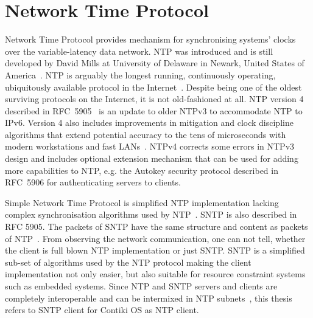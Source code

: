 
\chapter{Network Time Protocol}
Network Time Protocol provides mechanism for synchronising systems' clocks over the variable-latency data network.
NTP was introduced and is still developed by
David Mills at University of Delaware in Newark, United States of America~\cite{ntp-history}.
NTP is arguably the longest running, continuously operating,
ubiquitously available protocol in the Internet~\cite{ntp-overview}.
Despite being one of the oldest surviving protocols on the Internet, it is not old-fashioned at all.
NTP version 4 described in RFC~5905~\cite{rfc5905} is an update to older NTPv3 to accommodate NTP to IPv6.
Version 4 also includes improvements in
mitigation and clock discipline algorithms that extend
potential accuracy to the tens of microseconds with modern
workstations and fast LANs~\cite{rfc5905}.
NTPv4 corrects some
errors in NTPv3 design and includes optional extension mechanism
that can be used for adding more capabilities to NTP, e.g. the
Autokey security protocol described in RFC~5906
for authenticating servers to clients.

Simple Network Time Protocol is simplified NTP implementation lacking complex
synchronisation algorithms used by NTP~\cite{rfc5905}.
SNTP is also described in RFC 5905.
The packets of SNTP have the same structure and content as packets of NTP~\cite{rfc5905}.
From observing the network communication, one can not tell, whether the client
is full blown NTP implementation or just SNTP.
SNTP is a simplified sub-set of algorithms used by the NTP protocol
making the client implementation not only easier, but also suitable for
resource constraint systems such as embedded systems.
Since NTP and SNTP servers and clients are
completely interoperable and can be intermixed in NTP subnets~\cite{rfc5905},
this thesis refers to SNTP client for Contiki OS as NTP client.









